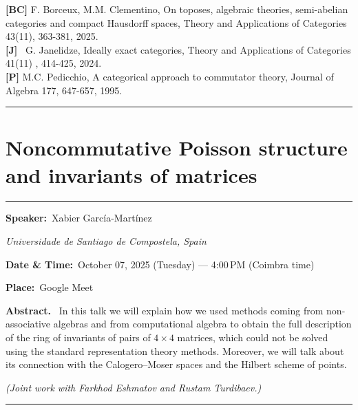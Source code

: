 \documentclass[11pt,a4paper]{article}
\newcommand{\Title}[1]{\section*{#1}\vspace{-0.25em}\hrule\vspace{0.8em}}
\newcommand{\Field}[2]{\textbf{#1:}~#2\par}
\newcommand{\Affil}[1]{\textit{#1}\par}
\newcommand{\Abstract}{\vspace{0.6em}\textbf{Abstract.}~}
\newcommand{\TalkBlockSep}{\vspace{1.25em}\hrule\vspace{1.25em}}
\begin{document}
\noindent
\textbf{[BC]} F. Borceux, M.M. Clementino, On toposes, algebraic theories,
semi-abelian categories and compact Hausdorff spaces, Theory and
Applications of Categories 43(11), 363-381, 2025.\\
\noindent
\textbf{[J]}  G. Janelidze, Ideally exact categories, Theory and Applications of
Categories 41(11) , 414-425, 2024.\\
\noindent
\textbf{[P]} M.C. Pedicchio, A categorical approach to commutator theory,
Journal of Algebra 177, 647-657, 1995.


\TalkBlockSep



\Title{Noncommutative Poisson structure and invariants of matrices}

\Field{Speaker}{Xabier García-Martínez}
\Affil{Universidade de Santiago de Compostela, Spain}

\Field{Date \& Time}{October 07, 2025 (Tuesday) — 4{:}00\,PM (Coimbra time)}
\Field{Place}{Google Meet}

\Abstract
In this talk we will explain how we used methods coming from non-associative algebras and from computational algebra to obtain the full description of the ring of invariants of pairs of $4 \times 4$ matrices, which could not be solved using the standard representation theory methods. Moreover, we will talk about its connection with the Calogero--Moser spaces and the Hilbert scheme of points.

\medskip
\textit{(Joint work with Farkhod Eshmatov and Rustam Turdibaev.)}

\TalkBlockSep
\end{document}
